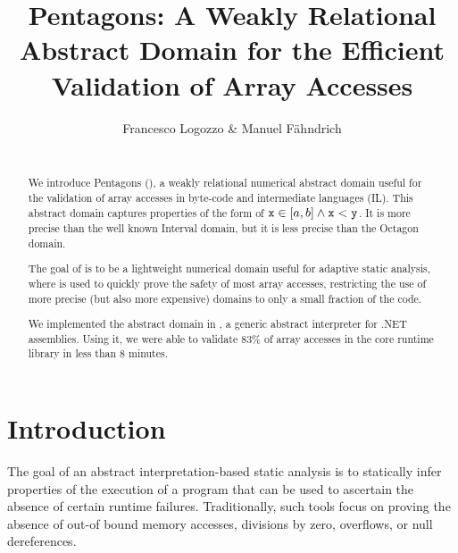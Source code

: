 \documentclass{sig-alternate}
\begin{document}

\title{Pentagons: A Weakly Relational Abstract Domain for the Efficient Validation of Array Accesses}

\author{
\alignauthor
 Francesco Logozzo \& Manuel F\"ahndrich \\        
\\
}
\maketitle
\begin{abstract}
We introduce Pentagons (\Pentagons),  a weakly relational numerical abstract
domain useful for the validation of array accesses in byte-code and
intermediate languages (IL).
This abstract domain captures properties of the form of $\mathtt{x} \in [a, b] \wedge \mathtt{x} < \mathtt{y}$.
It is more precise than the well known Interval
domain, but it is less precise than the Octagon domain.

The goal of \Pentagons{} is to be a lightweight numerical domain useful
for adaptive static analysis, where \Pentagons{} 
is used to quickly prove the safety of most array accesses, restricting the use of
more precise (but also more expensive) domains to only a small fraction of the code.

We implemented the \Pentagons{} abstract domain in \Clousot, a generic
abstract interpreter for .NET assemblies. Using it, we were able to
validate $83\%$ of array accesses in the core runtime library
 in less than 8 minutes.
 
\end{abstract}


\section{Introduction}
The goal of an abstract interpretation-based static analysis is to
statically infer properties of the execution of a program that can be
used to ascertain the absence of certain runtime failures.
Traditionally, such tools focus on proving the absence of out-of bound memory accesses, 
divisions by zero, overflows, or null dereferences.
\end{document}
